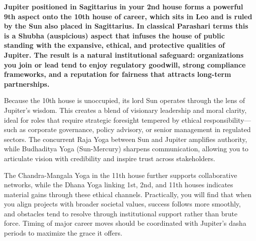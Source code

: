 
\label{topic13}

{\fontsize{9.5}{13.8}\selectfont\bfseries\color{DeepSlate} Jupiter positioned in Sagittarius in your 2nd house forms a powerful 9th aspect onto the 10th house of career, which sits in Leo and is ruled by the Sun also placed in Sagittarius. In classical Parashari terms this is a Shubha (auspicious) aspect that infuses the house of public standing with the expansive, ethical, and protective qualities of Jupiter. The result is a natural institutional safeguard: organizations you join or lead tend to enjoy regulatory goodwill, strong compliance frameworks, and a reputation for fairness that attracts long-term partnerships.}\par\vspace{2mm}

{\fontsize{9}{13}\selectfont Because the 10th house is unoccupied, its lord Sun operates through the lens of Jupiter's wisdom. This creates a blend of visionary leadership and moral clarity, ideal for roles that require strategic foresight tempered by ethical responsibility---such as corporate governance, policy advisory, or senior management in regulated sectors. The concurrent Raja Yoga between Sun and Jupiter amplifies authority, while Budhaditya Yoga (Sun-Mercury) sharpens communication, allowing you to articulate vision with credibility and inspire trust across stakeholders.}\par\vspace{1.8mm}

{\fontsize{9}{13}\selectfont The Chandra-Mangala Yoga in the 11th house further supports collaborative networks, while the Dhana Yoga linking 1st, 2nd, and 11th houses indicates material gains through these ethical channels. Practically, you will find that when you align projects with broader societal values, success follows more smoothly, and obstacles tend to resolve through institutional support rather than brute force. Timing of major career moves should be coordinated with Jupiter's dasha periods to maximize the grace it offers.}\par\vspace{1.8mm}

